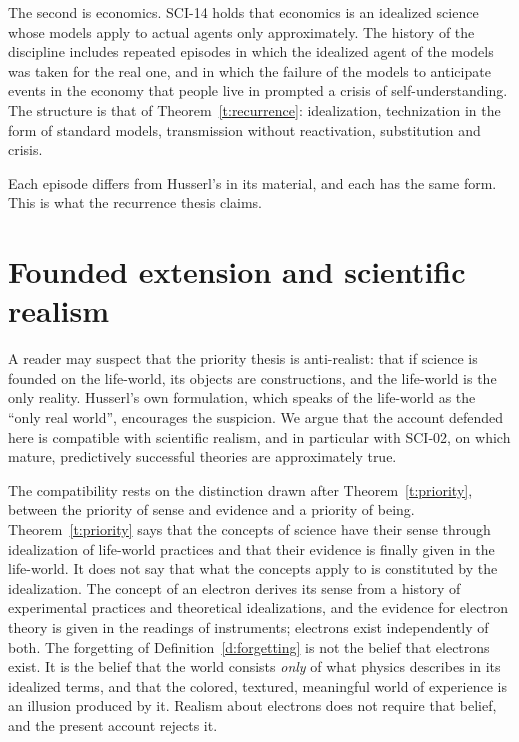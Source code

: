 \documentclass{situationist-preprint}
\begin{document}
The second is economics. SCI-14 holds that economics is an idealized science whose models apply to actual agents only approximately. The history of the discipline includes repeated episodes in which the idealized agent of the models was taken for the real one, and in which the failure of the models to anticipate events in the economy that people live in prompted a crisis of self-understanding. The structure is that of Theorem~\ref{t:recurrence}: idealization, technization in the form of standard models, transmission without reactivation, substitution and crisis.

Each episode differs from Husserl's in its material, and each has the same form. This is what the recurrence thesis claims.

\section{Founded extension and scientific realism}\label{s:realism}

A reader may suspect that the priority thesis is anti-realist: that if science is founded on the life-world, its objects are constructions, and the life-world is the only reality. Husserl's own formulation, which speaks of the life-world as the \enquote{only real world}, encourages the suspicion. We argue that the account defended here is compatible with scientific realism, and in particular with SCI-02, on which mature, predictively successful theories are approximately true.

The compatibility rests on the distinction drawn after Theorem~\ref{t:priority}, between the priority of sense and evidence and a priority of being. Theorem~\ref{t:priority} says that the concepts of science have their sense through idealization of life-world practices and that their evidence is finally given in the life-world. It does not say that what the concepts apply to is constituted by the idealization. The concept of an electron derives its sense from a history of experimental practices and theoretical idealizations, and the evidence for electron theory is given in the readings of instruments; electrons exist independently of both. The forgetting of Definition~\ref{d:forgetting} is not the belief that electrons exist. It is the belief that the world consists \emph{only} of what physics describes in its idealized terms, and that the colored, textured, meaningful world of experience is an illusion produced by it. Realism about electrons does not require that belief, and the present account rejects it.
\end{document}
